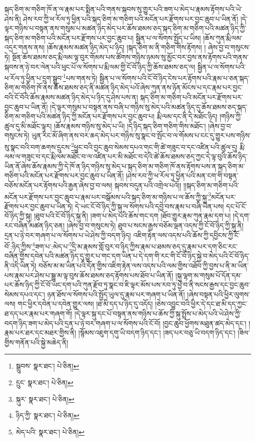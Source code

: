 སྐད་ཅིག་མ་གཅིག་ཁོ་ན་ལ་རྣམ་པར་སྨིན་པའི་གནས་སྐབས་སུ་གྱུར་པའི་ཟག་པ་མེད་པ་རྣམས་རྟོགས་པའི་ཡེ་ཤེས་ནི། ཤེས་རབ་ཀྱི་ཕ་རོལ་ཏུ་ཕྱིན་པའི་སྐད་ཅིག་མ་གཅིག་པའི་མངོན་པར་རྫོགས་པར་བྱང་ཆུབ་པ་ཡིན་ནོ། །དེ་ལྟར་གཉིས་པ་བསྟན་ནས་གསུམ་པ་མཚན་ཉིད་མེད་པར་ཆོས་ཐམས་ཅད་སྐད་ཅིག་མ་གཅིག་པའི་མཚན་ཉིད་ཀྱི་སྐད་ཅིག་མ་གཅིག་པའི་མངོན་པར་རྫོགས་པར་བྱང་ཆུབ་པ། སྦྱིན་པ་ལ་སོགས་སྤྱོད་པ་ཡིས། །ཆོས་ཀུན་རྨི་ལམ་འདྲར་གནས་ནས། །ཆོས་རྣམས་མཚན་ཉིད་མེད་པ་ཉིད། །སྐད་ཅིག་མ་ནི་གཅིག་གིས་རྟོགས། །
ཞེས་བྱ་བ་གསུངས་ཏེ། སྔོན་ཆོས་ཐམས་ཅད་རྨི་ལམ་ལྟ་བུར་གོམས་པས་ཚོགས་གཉིས་ཉམས་སུ་མྱོང་བར་བྱས་ནས་རྟོགས་པའི་གནས་སྐབས་ན་ཉེ་བར་ལེན་པའི་ཕུང་པོ་ལ་སོགས་པ་རྨི་ལམ་གྱི་ངོ་བོ་ཉིད་ཀྱི་ཆོས་ཐམས་ཅད་ལ། སྦྱིན་པ་ལ་སོགས་པའི་ཕ་རོལ་ཏུ་ཕྱིན་པ་དྲུག་སྒྲུབ་\footnote{སྒྲུབས་  སྣར་ཐང་།  པེ་ཅིན། }པས་གནས་ཏེ། སྦྱིན་པ་ལ་སོགས་པའི་ངོ་བོ་ཉིད་ངེས་པར་རྟོགས་པའི་རྣམ་པ་ཅན་སྐད་ཅིག་མ་གཅིག་ཁོ་ནས་ཆོས་ཐམས་ཅད་ནི་མཚན་ཉིད་མེད་པའོ་ཞེས་ཀུན་ནས་ཉོན་མོངས་པ་དང་རྣམ་པར་བྱང་བའི་ངོ་བོའི་ཆོས་རྣམས་མཚན་ཉིད་མེད་པ་ཉིད་དུ་ཤེས་པས་ན། སྐད་ཅིག་མ་གཅིག་པའི་མངོན་པར་རྫོགས་པར་བྱང་ཆུབ་པ་ཡིན་ནོ། །དེ་ལྟར་གསུམ་པ་བསྟན་ནས་བཞི་པ་གཉིས་སུ་མེད་པའི་མཚན་ཉིད་དུ་ཆོས་ཐམས་ཅད་སྐད་ཅིག་མ་གཅིག་པའི་མཚན་ཉིད་ཀྱི་མངོན་པར་རྫོགས་པར་བྱང་ཆུབ་པ། རྨི་ལམ་དང་ནི་དེ་མཐོང་ཉིད། །གཉིས་ཀྱི་ཚུལ་དུ་མི་མཐོང་ལྟར། །ཆོས་རྣམས་གཉིས་སུ་མེད་པ་ཡི། །དེ་ཉིད་སྐད་ཅིག་གཅིག་གིས་མཐོང་། །ཞེས་བྱ་བ་གསུངས་ཏེ། ཡུན་རིང་མོ་ཞིག་ནས་བར་ཆད་མེད་པར་གཉིས་སུ་སྣང་བ་སྤོང་བ་ལ་གོམས་པ་ངང་དུ་གྱུར་པས་གཉིས་སུ་སྣང་བའི་བག་ཆགས་དྲུངས་\footnote{དྲུང་  སྣར་ཐང་།  པེ་ཅིན། }ཕྱུང་བའི་བྱང་ཆུབ་སེམས་དཔའ་གང་གི་ཚེ་གཟུང་བ་དང་འཛིན་པའི་ཚུལ་དུ། རྨི་ལམ་ལ་གཟུང་བ་དང་རྨི་ལམ་མཐོང་བ་ལ་འཛིན་པར་མི་མཐོང་བ་དེའི་ཚེ་ཆོས་ཐམས་ཅད་ཀྱང་དེ་ལྟ་བུའི་ཆོས་ཉིད་ཡིན་ནོ་ཞེས་ཆོས་རྣམས་ཀྱི་དེ་ཁོ་ན་ཉིད་གཉིས་སུ་མེད་པ་སྐད་ཅིག་མ་གཅིག་ཁོ་ནས་རྟོགས་པས་ན་སྐད་ཅིག་མ་གཅིག་པའི་མངོན་པར་རྫོགས་པར་བྱང་ཆུབ་པ་ཡིན་ནོ། །ཤེས་རབ་ཀྱི་ཕ་རོལ་ཏུ་ཕྱིན་པའི་མན་ངག་གི་བསྟན་བཅོས་མངོན་པར་རྟོགས་པའི་རྒྱན་ཞེས་བྱ་བ་ལས། སྐབས་བདུན་པའི་འགྲེལ་པའོ།། །།སྐད་ཅིག་མ་གཅིག་པའི་མངོན་པར་རྫོགས་པར་བྱང་ཆུབ་པ་རྣམ་པར་བསྒོམས་པའི་སྐད་ཅིག་མ་གཉིས་པ་ལ་ཆོས་ཀྱི་སྐུ་\footnote{སྐུར་  སྣར་ཐང་།  པེ་ཅིན། }མངོན་པར་རྫོགས་པར་བྱང་ཆུབ་པ་ཡིན་ཏེ། དེ་ཡང་ངོ་བོ་ཉིད་ཀྱི་སྐུ་ལ་སོགས་པའི་དབྱེ་བས་རྣམ་པ་བཞི་ཡིན་པས། དང་པོ་ངོ་བོ་ཉིད་ཀྱི་སྐུ། །ཐུབ་པའི་ངོ་བོ་ཉིད་སྐུ་ནི། །ཟག་པ་མེད་པའི་ཆོས་གང་དག །ཐོབ་གྱུར་རྣམ་ཀུན་རྣམ་དག་པ། །དེ་དག་རང་བཞིན་མཚན་ཉིད་ཅན། །ཞེས་བྱ་བ་གསུངས་ཏེ། ཐུབ་པ་སངས་རྒྱས་བཅོམ་ལྡན་འདས་ཀྱི་ངོ་བོ་ཉིད་ཀྱི་སྐུ་ནི། དྲན་པ་ཉེ་བར་གཞག་པ་ལ་སོགས་པ་ཡེ་ཤེས་ཀྱི་བདག་ཉིད། འཇིག་རྟེན་ལས་འདས་པའི་ཆོས་ཀྱི་དབྱིངས་ཀྱི་ངོ་བོ་:ཉིད་ཀྱིས་\footnote{ཉིད་ཀྱི་  སྣར་ཐང་།  པེ་ཅིན། }ཟག་པ་:མེད་པ་\footnote{མེད་པའི་  སྣར་ཐང་།  པེ་ཅིན། }དྲི་མ་རྣམས་གློ་བུར་བ་ཉིད་ཀྱིས་རྣམ་པ་ཐམས་ཅད་དུ་རྣམ་པར་དག་ཅིང་རང་བཞིན་གྱིས་དབེན་པའི་མཚན་ཉིད་དུ་གྱུར་པ་གང་དག་ཡིན་པ་དེ་དག་གི་རང་གི་ངོ་བོ་ཉིད་སྐྱེ་བ་མེད་པའི་ངོ་བོ་ཉིད་ནི་འདི་ཡིན་ཏེ། བཅོས་མ་མ་ཡིན་པའི་དོན་གྱིས་འཇིག་རྟེན་ལས་འདས་པའི་ལམ་གྱིས་འཐོབ་ཀྱི་བྱས་པ་ནི་མ་ཡིན་པས་རྣམ་པར་ཤེས་པ་སྒྱུ་མ་ལྟ་བུས་ཆོས་ཐམས་ཅད་རྟོགས་པས་ཐོབ་པ་ཡིན་ནོ། །སྐུ་ལྷག་མ་གསུམ་པོ་དོན་དམ་པར་ཆོས་ཉིད་ཀྱི་ངོ་བོ་ཡང་དག་པའི་ཀུན་རྫོབ་ཏུ་སྣང་བ་ཇི་ལྟར་མོས་པས་རབ་ཏུ་ཕྱེ་བ་ནི་སངས་རྒྱས་དང་བྱང་ཆུབ་སེམས་དཔའ་དང་། ཉན་ཐོས་ལ་སོགས་པའི་སྤྱོད་ཡུལ་དུ་རྣམ་པར་གཞག་པ་ཡིན་ནོ། །ཞེས་བསྟན་པའི་ཕྱིར་ལུགས་ལས། གང་ཕྱིར་དབེན་པ་དབེན་གྱུར་ལས། །ཐ་མི་དད་པ་ཉིད་དུ་འདོད། །ཅེས་འབྱུང་བའི་ཕྱིར་དེ་དང་ཐ་མི་དད་ཀྱང་ཐ་དད་པར་རྣམ་པར་གཞག་གོ། །དེ་ལྟར་སྐུ་དང་པོ་བསྟན་ནས་གཉིས་པ་ཆོས་ཀྱི་སྐུ་སྤྲོས་པ་མེད་པའི་ཡེ་ཤེས་ཀྱི་བདག་ཉིད་ཟག་པ་མེད་པའི་དྲན་པ་ཉེ་བར་གཞག་པ་ལ་སོགས་པའི་ངོ་བོ། །བྱང་ཆུབ་ཕྱོགས་མཐུན་ཚད་མེད་དང་། །རྣམ་པར་ཐར་དང་མཐར་གྱིས་ནི། །སྙོམས་འཇུག་དགུ་ཡི་བདག་ཉིད་དང་། །ཟད་པར་བཅུ་ཡི་བདག་ཉིད་དང་། །ཟིལ་གྱིས་གནོན་པའི་སྐྱེ་མཆེད་ནི། 